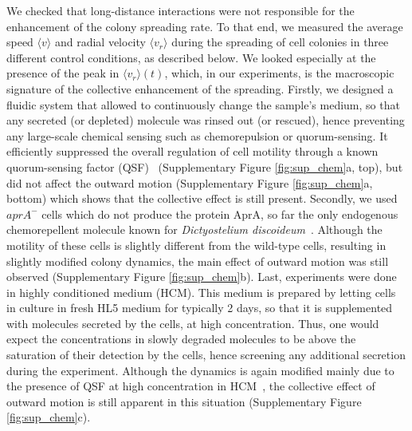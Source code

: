 \documentclass[11pt, twocolumn]{article}
\newcommand\rev[1]{{#1}}
\begin{document}
\rev{
We checked that long-distance interactions were not responsible for the
enhancement of the colony spreading rate. To that end, we measured the average speed
$\langle v\rangle$ and radial velocity $\langle v_r\rangle$ during the
spreading of cell colonies in three different control conditions, as described
below. We looked especially at the presence of the peak in $\langle v_r\rangle(t)$,
which, in our experiments, is the macroscopic signature of the collective
enhancement of the spreading.} Firstly, we designed a fluidic
system that allowed to continuously change the sample's medium, so
that any secreted (or depleted) molecule was rinsed out (or rescued),
hence preventing any large-scale chemical sensing such as
chemorepulsion or quorum-sensing. It efficiently suppressed the
overall regulation of cell motility through a known quorum-sensing
factor (QSF)~\cite{Gole2011} (Supplementary Figure
\ref{fig:sup_chem}a, top), but did not affect the outward motion
(Supplementary Figure \ref{fig:sup_chem}a, bottom) which shows
  that the collective effect is still present. Secondly, we used
$aprA^-$ cells which do not produce the protein AprA, so far the only
endogenous chemorepellent molecule known for \textit{Dictyostelium
  discoideum}~\cite{Phillips2012}. Although the motility of these
cells is slightly different from the wild-type cells, resulting in
slightly modified colony dynamics, the main effect of outward motion was
still observed (Supplementary Figure \ref{fig:sup_chem}b). Last,
experiments were done in highly conditioned medium (HCM). This medium
is prepared by letting cells in culture in fresh HL5 medium for
typically 2 days, so that it is supplemented with molecules secreted
by the cells, at high concentration. Thus, one would expect the
concentrations in slowly degraded molecules to be above the saturation
of their detection by the cells, hence screening any additional
secretion during the experiment. Although the dynamics is again
modified mainly due to the presence of QSF at high concentration in
HCM~\cite{Gole2011}, the collective effect of outward motion is still
apparent in this situation (Supplementary Figure \ref{fig:sup_chem}c).
\end{document}

